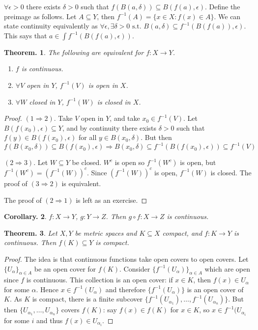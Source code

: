 \documentclass[11pt, a4paper]{memoir}
\theoremstyle{change}
\newtheorem{theorem}{Theorem.}[section]
\newtheorem{corollary}[theorem]{Corollary.}
\theoremstyle{plain}
\theoremstyle{nonumberplain}
\newtheorem{proof}{Proof}
\newcommand{\st}{\text{ s.t. }}
\numberwithin{equation}{section}
\begin{document}
$\forall\epsilon>0$ there exists $\delta>0$ such that $f(B(a,\delta))\subseteq B(f(a),\epsilon)$. Define the preimage
as follows. Let $A\subseteq Y$, then $f^{-1}(A)=\{x\in X:f(x)\in A\}$. We can state continuity equivalently as
$\forall\epsilon,\exists\delta>0\st B(a,\delta)\subseteq f^{-1}(B(f(a)),\epsilon)$. This says that $a\in\int f^{-1}(B(f(a),\epsilon))$.
\begin{theorem}
    The following are equivalent for $f:X\to Y$.
    \begin{enumerate}
        \item $f$ is continuous.
        \item $\forall V$ open in $Y$, $f^{-1}(V)$ is open in $X$.
        \item $\forall W$ closed in $Y$, $f^{-1}(W)$ is closed in $X$.
    \end{enumerate}
\end{theorem}
\begin{proof}
    $(1\Rightarrow 2)$. Take $V$ open in $Y$, and take $x_0\in f^{-1}(V)$. Let $B(f(x_0),\epsilon)\subseteq Y$, and
    by continuity there exists $\delta>0$ such that $f(y)\in B(f(x_0),\epsilon)$ for all $y\in B(x_0,\delta)$. But then
    $f(B(x_0,\delta))\subseteq B(f(x_0),\epsilon)\Rightarrow B(x_0,\delta)\subseteq f^{-1}(B(f(x_0),\epsilon))\subseteq f^{-1}(V)$

    $(2\Rightarrow 3)$. Let $W\subseteq Y$ be closed. $W^c$ is open so $f^{-1}(W^c)$ is open, but $f^{-1}(W^c)=(f^{-1}(W))^c$.
    Since $(f^{-1}(W))^c$ is open, $f^{-1}(W)$ is closed. The proof of $(3\Rightarrow 2)$ is equivalent.

    The proof of $(2\Rightarrow 1)$ is left as an exercise.
\end{proof}
\begin{corollary}
    $f:X\to Y$, $g:Y\to Z$. Then $g\circ f:X\to Z$ is continuous.
\end{corollary}
\begin{theorem}
    Let $X,Y$ be metric spaces and $K\subseteq X$ compact, and $f:K\to Y$ is continuous. Then $f(K)\subseteq Y$ is compact.
\end{theorem}
\begin{proof}
    The idea is that continuous functions take open covers to open covers. Let $\{U_\alpha\}_{\alpha\in A}$ be an open
    cover for $f(K)$. Consider $\{f^{-1}(U_\alpha)\}_{\alpha\in A}$ which are open since $f$ is continuous. This collection
    is an open cover: if $x\in K$, then $f(x)\in U_\alpha$ for some $\alpha$. Hence $x\in f^{-1}(U_\alpha)$ and therefore
    $\{f^{-1}(U_\alpha)\}$ is an open cover of $K$. As $K$ is compact, there is a finite subcover $\{f^{-1}(U_{\alpha_1}),\ldots,f^{-1}(U_{\alpha_n})\}$.
    But then $\{U_{\alpha_1},\ldots,U_{\alpha_n}\}$ covers $f(K)$: say $f(x)\in f(K)$ for $x\in K$, so $x\in f^{-1}(U_{\alpha_i}$
    for some $i$ and thus $f(x)\in U_{\alpha_i}$.
\end{proof}
\end{document}
